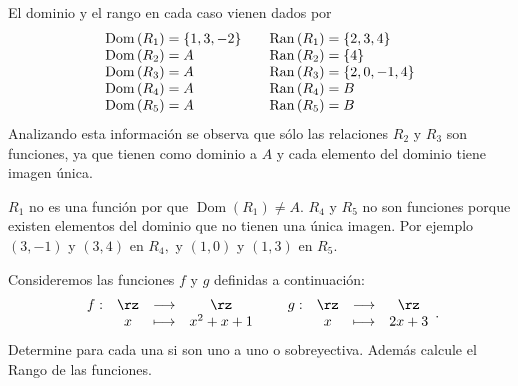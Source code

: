\begin{sol}
El dominio y el rango en cada caso vienen dados por
\[%
\begin{array}
[c]{lll}%
\operatorname*{Dom}\left(  R_{1}\right)  =\left\{  1,3,-2\right\}  &  &
\operatorname*{Ran}\left(  R_{1}\right)  =\left\{  2,3,4\right\} \\
\operatorname*{Dom}\left(  R_{2}\right)  =A &  & \operatorname*{Ran}\left(
R_{2}\right)  =\left\{  4\right\} \\
\operatorname*{Dom}\left(  R_{3}\right)  =A &  & \operatorname*{Ran}\left(
R_{3}\right)  =\left\{  2,0,-1,4\right\} \\
\operatorname*{Dom}\left(  R_{4}\right)  =A &  & \operatorname*{Ran}\left(
R_{4}\right)  =B\\
\operatorname*{Dom}\left(  R_{5}\right)  =A &  & \operatorname*{Ran}\left(
R_{5}\right)  =B
\end{array}
\]
Analizando esta informaci\'{o}n se observa que s\'{o}lo las relaciones $R_{2}$
y $R_{3}$ son funciones, ya que tienen como dominio a $A$ y cada elemento del
dominio tiene imagen \'{u}nica.

$R_{1}$ no es una funci\'{o}n por que $\operatorname*{Dom}\left(
R_{1}\right)  \neq A.$ $R_{4}$ y $R_{5}$ no son funciones porque existen
elementos del dominio que no tienen una \'{u}nica imagen. Por ejemplo $\left(
3,-1\right)  $ y $\left(  3,4\right)  $ en $R_{4},$ y $\left(  1,0\right)  $ y
$\left(  1,3\right)  $ en $R_{5}$.
\end{sol}

\begin{example}
Consideremos las funciones $f$ y $g$ definidas a continuaci\'{o}n:
\[%
\begin{array}
[c]{ccccccccc}%
f: & \rz & \longrightarrow & \rz & \,\,\, & g: & \rz & \longrightarrow & \rz\\
& x & \longmapsto & x^{2}+x+1 & \,\,\, &  & x & \longmapsto & 2x+3
\end{array}
.
\]
Determine para cada una si son uno a uno o sobreyectiva. Adem\'{a}s calcule el
Rango de las funciones.
\end{example}

